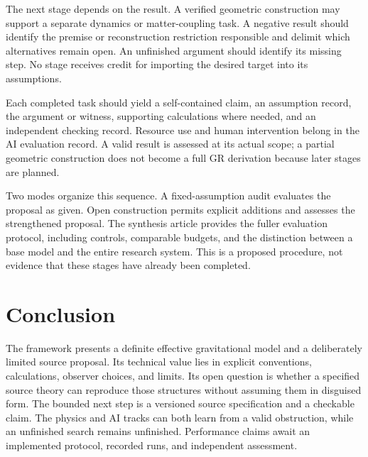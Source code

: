 \documentclass[11pt]{article}
\begin{document}
The next stage depends on the result. A verified geometric construction may support a separate dynamics or matter-coupling task. A negative result should identify the premise or reconstruction restriction responsible and delimit which alternatives remain open. An unfinished argument should identify its missing step. No stage receives credit for importing the desired target into its assumptions.

Each completed task should yield a self-contained claim, an assumption record, the argument or witness, supporting calculations where needed, and an independent checking record. Resource use and human intervention belong in the AI evaluation record. A valid result is assessed at its actual scope; a partial geometric construction does not become a full GR derivation because later stages are planned.

Two modes organize this sequence. A fixed-assumption audit evaluates the proposal as given. Open construction permits explicit additions and assesses the strengthened proposal. The synthesis article provides the fuller evaluation protocol, including controls, comparable budgets, and the distinction between a base model and the entire research system. This is a proposed procedure, not evidence that these stages have already been completed.

\section{Conclusion}
The framework presents a definite effective gravitational model and a deliberately limited source proposal. Its technical value lies in explicit conventions, calculations, observer choices, and limits. Its open question is whether a specified source theory can reproduce those structures without assuming them in disguised form.
The bounded next step is a versioned source specification and a checkable claim. The physics and AI tracks can both learn from a valid obstruction, while an unfinished search remains unfinished. Performance claims await an implemented protocol, recorded runs, and independent assessment.

\References
\end{document}
